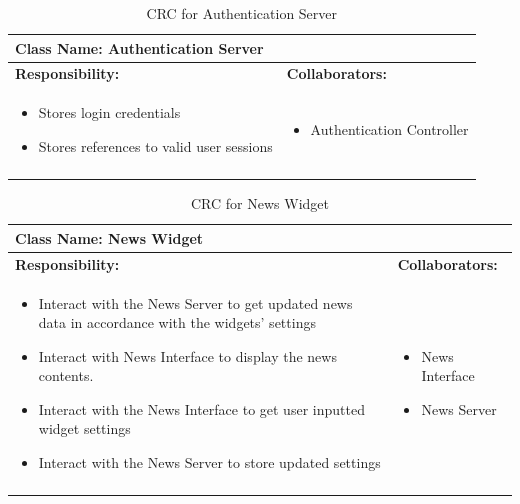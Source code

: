 \documentclass[]{article}
\begin{document}
\begin{longtable}{| p{} | p{} |}
	\hline
	\multicolumn{2}{|l|}{\textbf{Class Name: Authentication Server}} \\
	\hline
	\textbf{Responsibility:} & \textbf{Collaborators:} \\
	\hline
	\begin{itemize}
		\item Stores login credentials
		\item Stores references to valid user sessions
    \end{itemize} & 
	\begin{itemize}
		\item Authentication Controller
	\end{itemize} \\
	\hline
	\caption{CRC for Authentication Server}
\end{longtable}
\newpage
\begin{longtable}{| p{} | p{} |}
	\hline
	\multicolumn{2}{|l|}{\textbf{Class Name: News Widget}} \\
	\hline
	\textbf{Responsibility:} & \textbf{Collaborators:} \\
	\hline
	\begin{itemize}
		\item Interact with the News Server to get updated news data in accordance with the widgets' settings
		\item Interact with News Interface to display the news contents.
		\item Interact with the News Interface to get user inputted widget settings
		\item Interact with the News Server to store updated settings
    \end{itemize} & 
	\begin{itemize}
		\item News Interface
        \item News Server
	\end{itemize} \\
	\hline
	\caption{CRC for News Widget}
\end{longtable}
\end{document}
